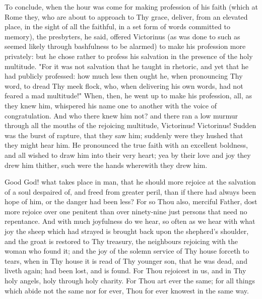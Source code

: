 \documentclass[b5paper,openright,12pt,twoside]{book}
\begin{document}
To conclude, when the hour was come for making profession of his faith
(which at Rome they, who are about to approach to Thy grace, deliver,
from an elevated place, in the sight of all the faithful, in a set
form of words committed to memory), the presbyters, he said, offered
Victorinus (as was done to such as seemed likely through bashfulness to
be alarmed) to make his profession more privately: but he chose rather
to profess his salvation in the presence of the holy multitude. "For
it was not salvation that he taught in rhetoric, and yet that he had
publicly professed: how much less then ought he, when pronouncing Thy
word, to dread Thy meek flock, who, when delivering his own words,
had not feared a mad multitude!" When, then, he went up to make his
profession, all, as they knew him, whispered his name one to another
with the voice of congratulation. And who there knew him not? and there
ran a low murmur through all the mouths of the rejoicing multitude,
Victorinus! Victorinus! Sudden was the burst of rapture, that they saw
him; suddenly were they hushed that they might hear him. He pronounced
the true faith with an excellent boldness, and all wished to draw him
into their very heart; yea by their love and joy they drew him thither,
such were the hands wherewith they drew him.

Good God! what takes place in man, that he should more rejoice at the
salvation of a soul despaired of, and freed from greater peril, than if
there had always been hope of him, or the danger had been less? For so
Thou also, merciful Father, dost more rejoice over one penitent than
over ninety-nine just persons that need no repentance. And with much
joyfulness do we hear, so often as we hear with what joy the sheep which
had strayed is brought back upon the shepherd's shoulder, and the groat
is restored to Thy treasury, the neighbours rejoicing with the woman
who found it; and the joy of the solemn service of Thy house forceth
to tears, when in Thy house it is read of Thy younger son, that he was
dead, and liveth again; had been lost, and is found. For Thou rejoicest
in us, and in Thy holy angels, holy through holy charity. For Thou art
ever the same; for all things which abide not the same nor for ever,
Thou for ever knowest in the same way.
\end{document}
